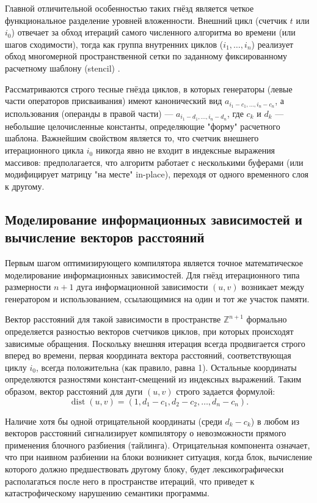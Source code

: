 \documentclass[14pt, russian]{scrartcl}
\begin{document}
Главной отличительной особенностью таких гнёзд является четкое функциональное разделение уровней вложенности. Внешний цикл (счетчик $t$ или $i_0$) отвечает за обход итераций самого численного алгоритма во времени (или шагов сходимости), тогда как группа внутренних циклов ($i_1, \dots, i_n$) реализует обход многомерной пространственной сетки по заданному фиксированному расчетному шаблону (stencil) \cite{metelica2024}.

Рассматриваются строго тесные гнёзда циклов, в которых генераторы (левые части операторов присваивания) имеют канонический вид $a_{i_1-c_1, \dots, i_n-c_n}$, а использования (операнды в правой части) --- $a_{i_1-d_1, \dots, i_n-d_n}$, где $c_k$ и $d_k$ --- небольшие целочисленные константы, определяющие "форму" расчетного шаблона. Важнейшим свойством является то, что счетчик внешнего итерационного цикла $i_0$ никогда явно не входит в индексные выражения массивов: предполагается, что алгоритм работает с несколькими буферами (или модифицирует матрицу "на месте" in-place), переходя от одного временного слоя к другому.

\subsection{Моделирование информационных зависимостей и вычисление векторов расстояний}

Первым шагом оптимизирующего компилятора является точное математическое моделирование информационных зависимостей. Для гнёзд итерационного типа размерности $n+1$ дуга информационной зависимости $(u, v)$ возникает между генератором и использованием, ссылающимися на один и тот же участок памяти.

Вектор расстояний для такой зависимости в пространстве $\mathbb{Z}^{n+1}$ формально определяется разностью векторов счетчиков циклов, при которых происходят зависимые обращения. Поскольку внешняя итерация всегда продвигается строго вперед во времени, первая координата вектора расстояний, соответствующая циклу $i_0$, всегда положительна (как правило, равна 1). Остальные координаты определяются разностями констант-смещений из индексных выражений. Таким образом, вектор расстояний для дуги $(u, v)$ строго задается формулой:
\begin{equation}
\label{eq:dist}
\operatorname{dist}(u, v) = (1, d_1 - c_1, d_2 - c_2, \dots, d_n - c_n).
\end{equation}

Наличие хотя бы одной отрицательной координаты (среди $d_k - c_k$) в любом из векторов расстояний сигнализирует компилятору о невозможности прямого применения блочного разбиения (тайлинга). Отрицательная компонента означает, что при наивном разбиении на блоки возникнет ситуация, когда блок, вычисление которого должно предшествовать другому блоку, будет лексикографически располагаться после него в пространстве итераций, что приведет к катастрофическому нарушению семантики программы.
\end{document}

